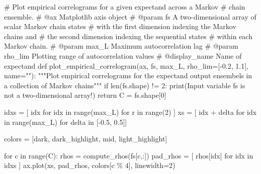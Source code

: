 \documentclass[
  letterpaper,
  DIV=11,
  numbers=noendperiod]{scrartcl}
\newenvironment{Shaded}{\begin{snugshade}}{\end{snugshade}}
\newcommand{\BuiltInTok}[1]{\textcolor[rgb]{0.00,0.23,0.31}{#1}}
\newcommand{\CommentTok}[1]{\textcolor[rgb]{0.37,0.37,0.37}{#1}}
\newcommand{\ControlFlowTok}[1]{\textcolor[rgb]{0.00,0.23,0.31}{#1}}
\newcommand{\DecValTok}[1]{\textcolor[rgb]{0.68,0.00,0.00}{#1}}
\newcommand{\FloatTok}[1]{\textcolor[rgb]{0.68,0.00,0.00}{#1}}
\newcommand{\KeywordTok}[1]{\textcolor[rgb]{0.00,0.23,0.31}{#1}}
\newcommand{\NormalTok}[1]{\textcolor[rgb]{0.00,0.23,0.31}{#1}}
\newcommand{\OperatorTok}[1]{\textcolor[rgb]{0.37,0.37,0.37}{#1}}
\newcommand{\StringTok}[1]{\textcolor[rgb]{0.13,0.47,0.30}{#1}}
\begin{document}
\begin{Shaded}
\begin{Highlighting}[]
\CommentTok{\# Plot empirical correlograms for a given expectand across a Markov}
\CommentTok{\# chain ensemble.}
\CommentTok{\# @ax Matplotlib axis object}
\CommentTok{\# @param fs A two{-}dimensional array of scalar Markov chain states}
\CommentTok{\#           with the first dimension indexing the Markov chains and}
\CommentTok{\#           the second dimension indexing the sequential states}
\CommentTok{\#           within each Markov chain.}
\CommentTok{\# @param max\_L Maximum autocorrelation lag}
\CommentTok{\# @param rho\_lim Plotting range of autocorrelation values}
\CommentTok{\# @display\_name Name of expectand}
\KeywordTok{def}\NormalTok{ plot\_empirical\_correlogram(ax,}
\NormalTok{                               fs,}
\NormalTok{                               max\_L,}
\NormalTok{                               rho\_lim}\OperatorTok{=}\NormalTok{[}\OperatorTok{{-}}\FloatTok{0.2}\NormalTok{, }\FloatTok{1.1}\NormalTok{],}
\NormalTok{                               name}\OperatorTok{=}\StringTok{""}\NormalTok{):}
  \CommentTok{"""Plot empirical correlograms for the expectand output ensembels in a}
\CommentTok{     collection of Markov chains"""}
  \ControlFlowTok{if} \BuiltInTok{len}\NormalTok{(fs.shape) }\OperatorTok{!=} \DecValTok{2}\NormalTok{:}
    \BuiltInTok{print}\NormalTok{(}\StringTok{\textquotesingle{}Input variable \textasciigrave{}fs\textasciigrave{} is not a two{-}dimensional array!\textquotesingle{}}\NormalTok{)}
    \ControlFlowTok{return}
\NormalTok{  C }\OperatorTok{=}\NormalTok{ fs.shape[}\DecValTok{0}\NormalTok{]}
  
\NormalTok{  idxs }\OperatorTok{=}\NormalTok{ [ idx }\ControlFlowTok{for}\NormalTok{ idx }\KeywordTok{in} \BuiltInTok{range}\NormalTok{(max\_L) }\ControlFlowTok{for}\NormalTok{ r }\KeywordTok{in} \BuiltInTok{range}\NormalTok{(}\DecValTok{2}\NormalTok{) ]}
\NormalTok{  xs }\OperatorTok{=}\NormalTok{ [ idx }\OperatorTok{+}\NormalTok{ delta }\ControlFlowTok{for}\NormalTok{ idx }\KeywordTok{in} \BuiltInTok{range}\NormalTok{(max\_L) }\ControlFlowTok{for}\NormalTok{ delta }\KeywordTok{in}\NormalTok{ [}\OperatorTok{{-}}\FloatTok{0.5}\NormalTok{, }\FloatTok{0.5}\NormalTok{]]}
  
\NormalTok{  colors }\OperatorTok{=}\NormalTok{ [dark, dark\_highlight, mid, light\_highlight]}
  
  \ControlFlowTok{for}\NormalTok{ c }\KeywordTok{in} \BuiltInTok{range}\NormalTok{(C):}
\NormalTok{    rhos }\OperatorTok{=}\NormalTok{ compute\_rhos(fs[c,:])}
\NormalTok{    pad\_rhos }\OperatorTok{=}\NormalTok{ [ rhos[idx] }\ControlFlowTok{for}\NormalTok{ idx }\KeywordTok{in}\NormalTok{ idxs ]}
\NormalTok{    ax.plot(xs, pad\_rhos, colors[c }\OperatorTok{\%} \DecValTok{4}\NormalTok{], linewidth}\OperatorTok{=}\DecValTok{2}\NormalTok{)}
  

\end{Highlighting}
\end{Shaded}
\end{document}
